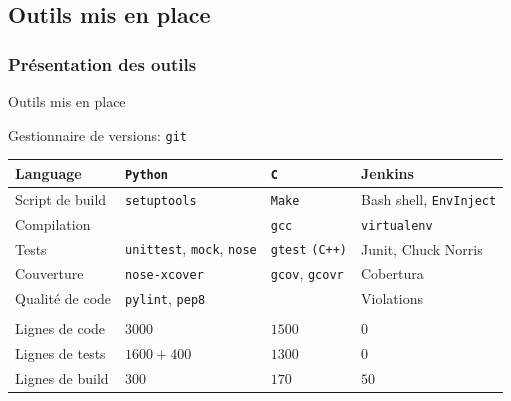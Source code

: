 \documentclass[9pt]{beamer}
\begin{document}
\subsection{Outils mis en place}
\frame{\tableofcontents[currentsubsection,sectionstyle=show/shaded,subsectionstyle=show/shaded,subsubsectionstyle=show/show/shaded]}

\subsubsection{Présentation des outils}
\begin{frame}{Outils mis en place}

  Gestionnaire de versions: \texttt{git}
  \begin{tabular}{ l | l l l }
    Language         & \texttt{Python}     & \texttt{C}    & Jenkins \\ \hline
    Script de build  & \texttt{setuptools} & \texttt{Make} & Bash shell, \texttt{EnvInject}\\
    Compilation      & ~                   & \texttt{gcc}  & \texttt{virtualenv} \\
    Tests            & \texttt{unittest}, \texttt{mock}, \texttt{nose}
                     & \texttt{gtest} \texttt{(C++)}
                     & Junit, Chuck Norris\\
    Couverture       & \texttt{nose-xcover}
                     & \texttt{gcov}, \texttt{gcovr}
                     & Cobertura \\
   Qualité de code  & \texttt{pylint}, \texttt{pep8} & ~  & Violations \\
    \\
    Lignes de code   &  $3000$        &  $1500$  &  $0$  \\
    Lignes de tests  &  $1600 + 400$  &  $1300$  &  $0$  \\
    Lignes de build  &  $300$         &  $170$   &  $50$ \\

  \end{tabular}
\end{frame}
\end{document}
